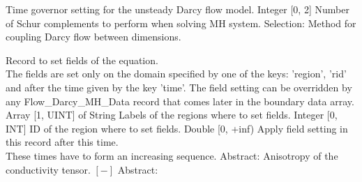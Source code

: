 \begin{RecordType}
			{\textlangle{ \it{{\{}{\}}} }\textrangle}
			{} %
			{{{Time governor setting for the unsteady Darcy flow model.}}}
		\KeyItem
			{}
			{{Integer [0, 2]}}
			{\textrangle}
			{} %
			{{{Number of Schur complements to perform when solving MH system.}}}
		\KeyItem
			{}
			{{Selection}{: }}
			{\textrangle}
			{} %
			{{{Method for coupling Darcy flow between dimensions.}}}
\end{RecordType}
\begin{RecordType}
	{}
	{} %
	{} %
	{} %
	{{{Record to set fields of the equation.}\\{
The fields are set only on the domain specified by one of the keys: 'region', 'rid'}\\{
and after the time given by the key 'time'. The field setting can be overridden by}\\{
 any Flow{\_}Darcy{\_}MH{\_}Data record that comes later in the boundary data array.}}}
		\KeyItem
			{}
			{{Array [1, UINT] of }{String}}
			{\textrangle}
			{} %
			{{{Labels of the regions where to set fields. }}}
		\KeyItem
			{}
			{{Integer [0, INT]}}
			{\textrangle}
			{} %
			{{{ID of the region where to set fields.}}}
		\KeyItem
			{}
			{{Double [0, +inf)}}
			{\textrangle}
			{} %
			{{{Apply field setting in this record after this time.}\\{
These times have to form an increasing sequence.}}}
		\KeyItem
			{}
			{{Abstract}{: }}
			{\textrangle}
			{} %
			{{{Anisotropy of the conductivity tensor. }{$[-]$}}}
		\KeyItem
			{}
			{{Abstract}{: }}

\end{RecordType}
